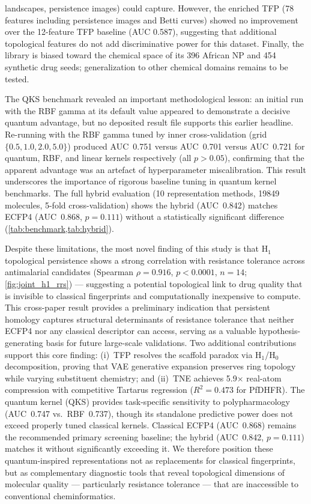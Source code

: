 \documentclass[11pt,a4paper]{article}
\begin{document}
landscapes, persistence images) could capture. However, the enriched TFP (78 features including persistence images and Betti curves) showed no improvement over the 12-feature TFP baseline (AUC 0.587), suggesting that additional topological features do not add discriminative power for this dataset. Finally, the library is biased toward the chemical space of its 396 African NP and 454 synthetic drug seeds; generalization to other chemical domains remains to be tested.

The QKS benchmark revealed an important methodological lesson: an initial run with the RBF gamma at its default value appeared to demonstrate a decisive quantum advantage, but no deposited result file supports this earlier headline. Re-running with the RBF gamma tuned by inner cross-validation (grid $\{0.5, 1.0, 2.0, 5.0\}$) produced AUC~0.751 versus AUC~0.701 versus AUC~0.721 for quantum, RBF, and linear kernels respectively (all $p > \num{0.05}$), confirming that the apparent advantage was an artefact of hyperparameter miscalibration. This result underscores the importance of rigorous baseline tuning in quantum kernel benchmarks. The full hybrid evaluation (10 representation methods, \num{19849} molecules, 5-fold cross-validation) shows the hybrid (AUC~0.842) matches ECFP4 (AUC~0.868, $p = \num{0.111}$) without a statistically significant difference (\cref{tab:benchmark,tab:hybrid}).

Despite these limitations, the most novel finding of this study is that H$_1$ topological persistence shows a strong correlation with resistance tolerance across antimalarial candidates (Spearman $\rho = 0.916$, $p < 0.0001$, $n = 14$; \cref{fig:joint_h1_rrs}) --- suggesting a potential topological link to drug quality that is invisible to classical fingerprints and computationally inexpensive to compute. This cross-paper result provides a preliminary indication that persistent homology captures structural determinants of resistance tolerance that neither ECFP4 nor any classical descriptor can access, serving as a valuable hypothesis-generating basis for future large-scale validations. Two additional contributions support this core finding: (i)~TFP resolves the scaffold paradox via H$_1$/H$_0$ decomposition, proving that VAE generative expansion preserves ring topology while varying substituent chemistry; and (ii)~TNE achieves \num{5.9}$\times$ real-atom compression with competitive Tartarus regression ($R^2 = 0.473$ for PfDHFR). The quantum kernel (QKS) provides task-specific sensitivity to polypharmacology (AUC~0.747 vs.~RBF~0.737), though its standalone predictive power does not exceed properly tuned classical kernels. Classical ECFP4 (AUC~0.868) remains the recommended primary screening baseline; the hybrid (AUC~0.842, $p = \num{0.111}$) matches it without significantly exceeding it. We therefore position these quantum-inspired representations not as replacements for classical fingerprints, but as complementary diagnostic tools that reveal topological dimensions of molecular quality --- particularly resistance tolerance --- that are inaccessible to conventional cheminformatics.
\end{document}
